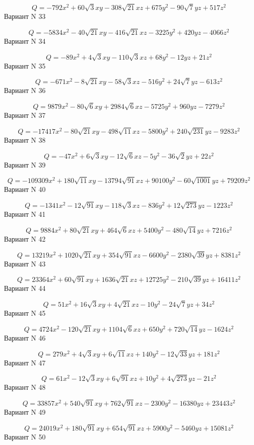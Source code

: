 \documentclass[11pt]{report}
\begin{document}
$$Q = - 792 x^{2} + 60 \sqrt{3} x y - 308 \sqrt{21} x z + 675 y^{2} - 90 \sqrt{7} y z + 517 z^{2}$$Вариант N 33

$$Q = - 5834 x^{2} - 40 \sqrt{21} x y - 416 \sqrt{21} x z - 3225 y^{2} + 420 y z - 4066 z^{2}$$Вариант N 34

$$Q = - 89 x^{2} + 4 \sqrt{3} x y - 110 \sqrt{3} x z + 68 y^{2} - 12 y z + 21 z^{2}$$Вариант N 35

$$Q = - 671 x^{2} - 8 \sqrt{21} x y - 58 \sqrt{3} x z - 516 y^{2} + 24 \sqrt{7} y z - 613 z^{2}$$Вариант N 36

$$Q = 9879 x^{2} - 80 \sqrt{6} x y + 2984 \sqrt{6} x z - 5725 y^{2} + 960 y z - 7279 z^{2}$$Вариант N 37

$$Q = - 17417 x^{2} - 80 \sqrt{21} x y - 498 \sqrt{11} x z - 5800 y^{2} + 240 \sqrt{231} y z - 9283 z^{2}$$Вариант N 38

$$Q = - 47 x^{2} + 6 \sqrt{3} x y - 12 \sqrt{6} x z - 5 y^{2} - 36 \sqrt{2} y z + 22 z^{2}$$Вариант N 39

$$Q = - 109309 x^{2} + 180 \sqrt{11} x y - 13794 \sqrt{91} x z + 90100 y^{2} - 60 \sqrt{1001} y z + 79209 z^{2}$$Вариант N 40

$$Q = - 1341 x^{2} - 12 \sqrt{91} x y - 118 \sqrt{3} x z - 836 y^{2} + 12 \sqrt{273} y z - 1223 z^{2}$$Вариант N 41

$$Q = 9884 x^{2} + 80 \sqrt{21} x y + 464 \sqrt{6} x z + 5400 y^{2} - 480 \sqrt{14} y z + 7216 z^{2}$$Вариант N 42

$$Q = 13219 x^{2} + 1020 \sqrt{21} x y + 354 \sqrt{91} x z - 6600 y^{2} - 2380 \sqrt{39} y z + 8381 z^{2}$$Вариант N 43

$$Q = 23364 x^{2} + 60 \sqrt{91} x y + 1636 \sqrt{21} x z + 12725 y^{2} - 210 \sqrt{39} y z + 16411 z^{2}$$Вариант N 44

$$Q = 51 x^{2} + 16 \sqrt{3} x y + 4 \sqrt{21} x z - 10 y^{2} - 24 \sqrt{7} y z + 34 z^{2}$$Вариант N 45

$$Q = 4724 x^{2} - 120 \sqrt{21} x y + 1104 \sqrt{6} x z + 650 y^{2} + 720 \sqrt{14} y z - 1624 z^{2}$$Вариант N 46

$$Q = 279 x^{2} + 4 \sqrt{3} x y + 6 \sqrt{11} x z + 140 y^{2} - 12 \sqrt{33} y z + 181 z^{2}$$Вариант N 47

$$Q = 61 x^{2} - 12 \sqrt{3} x y + 6 \sqrt{91} x z + 10 y^{2} + 4 \sqrt{273} y z - 21 z^{2}$$Вариант N 48

$$Q = 33857 x^{2} + 540 \sqrt{91} x y + 762 \sqrt{91} x z - 2300 y^{2} - 16380 y z + 23443 z^{2}$$Вариант N 49

$$Q = 24019 x^{2} + 180 \sqrt{91} x y + 654 \sqrt{91} x z + 5900 y^{2} - 5460 y z + 15081 z^{2}$$Вариант N 50
\end{document}
